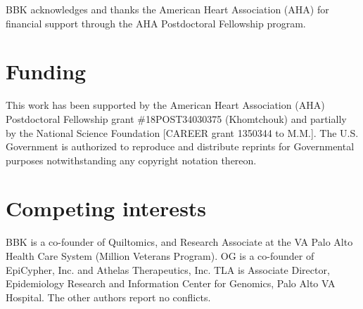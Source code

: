 \documentclass[letter]{bioinfo}
\begin{document}
	BBK acknowledges and thanks the American Heart Association (AHA) for financial support through the AHA Postdoctoral Fellowship program.
	\vspace*{-12pt}
	
	\section*{Funding}
	
	This work has been supported by the American Heart Association (AHA) Postdoctoral Fellowship grant \#18POST34030375 (Khomtchouk) and partially by the National Science Foundation [CAREER grant 1350344 to M.M.]. The U.S. Government is authorized to reproduce and distribute reprints for Governmental purposes notwithstanding any copyright notation thereon.\vspace*{-12pt}
	
	\section*{Competing interests}
	
	BBK is a co-founder of Quiltomics, and Research Associate at the VA Palo Alto Health Care System (Million Veterans Program).  OG is a co-founder of EpiCypher, Inc. and Athelas Therapeutics, Inc.  TLA is Associate Director, Epidemiology Research and Information 
    Center for Genomics, Palo Alto VA Hospital.  The other authors report no conflicts.\vspace*{-12pt} 
	
	
	
	
	
	
\end{document}
